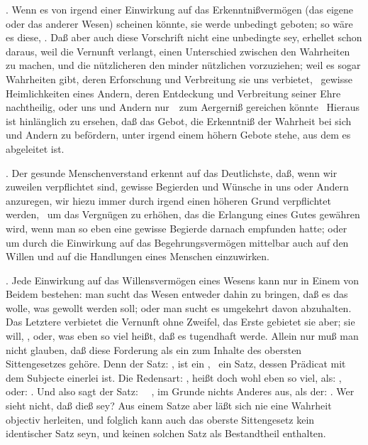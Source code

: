 \begin{aufza}
\begin{aufzb}
\item {}. Wenn es von irgend einer Einwirkung auf das Erkenntnißvermögen (das eigene oder das anderer Wesen) scheinen könnte, sie werde unbedingt geboten; so wäre es diese, . Daß aber auch diese Vorschrift nicht eine unbedingte sey, erhellet schon daraus, weil die Vernunft verlangt, einen Unterschied zwischen den Wahrheiten zu machen, und die nützlicheren den minder nützlichen vorzuziehen; weil es sogar Wahrheiten gibt, deren Erforschung und Verbreitung sie uns verbietet, \zB\ gewisse Heimlichkeiten eines Andern, deren Entdeckung und Verbreitung seiner Ehre nachtheilig, oder uns und Andern nur~\ zum Aergerniß gereichen könnte \usw\ Hieraus ist hinlänglich zu ersehen, daß das Gebot, die Erkenntniß der Wahrheit bei sich und Andern zu befördern, unter irgend einem höhern Gebote stehe, aus dem es abgeleitet ist.
\item {}. Der gesunde Menschenverstand erkennt auf das Deutlichste, daß, wenn wir zuweilen verpflichtet sind, gewisse Begierden und Wünsche in uns oder Andern anzuregen, wir hiezu immer durch irgend einen höheren Grund verpflichtet werden, \zB\ um das Vergnügen zu erhöhen, das die Erlangung eines Gutes gewähren wird, wenn man so eben eine gewisse Begierde darnach empfunden hatte; oder um durch die Einwirkung auf das Begehrungsvermögen mittelbar auch auf den Willen und auf die Handlungen eines Menschen einzuwirken.
\item {}. Jede Einwirkung auf das Willensvermögen eines Wesens kann nur in Einem von Beidem bestehen: man sucht das Wesen entweder dahin zu bringen, daß es das wolle, was gewollt werden soll; oder man sucht es umgekehrt davon abzuhalten. Das Letztere verbietet die Vernunft ohne Zweifel, das Erste gebietet sie aber; sie will, , oder, was eben so viel heißt, daß es tugendhaft werde. Allein nur muß man nicht glauben, daß diese Forderung als ein  zum Inhalte des obersten Sittengesetzes gehöre. Denn der Satz: , ist ein , \dh\ ein Satz, dessen Prädicat mit dem Subjecte einerlei ist. Die Redensart: , heißt doch wohl eben so viel, als: , oder: . Und also sagt der Satz: ~\ , im Grunde nichts Anderes aus, als der: . Wer sieht nicht, daß dieß  sey? Aus einem  Satze aber läßt sich nie eine Wahrheit objectiv herleiten, und folglich kann auch das oberste Sittengesetz kein identischer Satz seyn, und keinen solchen Satz als Bestandtheil enthalten.

\end{aufzb}
\end{aufza}
